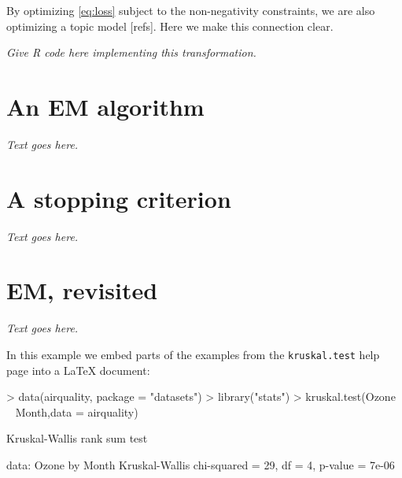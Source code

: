 \documentclass[final]{siamart171218}
\begin{document}
By optimizing \eqref{eq:loss} subject to the non-negativity
constraints, we are also optimizing a topic model [refs]. Here we make
this connection clear.

{\em Give R code here implementing this transformation.}

\section{An EM algorithm}

{\em Text goes here.}

\section{A stopping criterion}

{\em Text goes here.}

\section{EM, revisited}

{\em Text goes here.}

In this example we embed parts of the examples from the
\texttt{kruskal.test} help page into a \LaTeX{} document:
\begin{Schunk}
\begin{Sinput}
> data(airquality, package = "datasets")
> library("stats")
> kruskal.test(Ozone ~ Month,data = airquality)
\end{Sinput}
\begin{Soutput}
	Kruskal-Wallis rank sum test

data:  Ozone by Month
Kruskal-Wallis chi-squared = 29, df = 4, p-value = 7e-06
\end{Soutput}
\end{Schunk}
\end{document}
